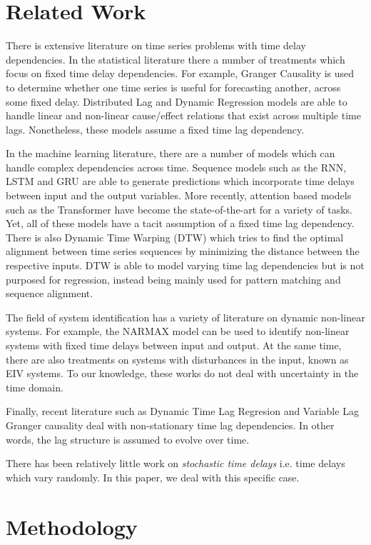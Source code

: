 \documentclass[11pt]{amsart}
\begin{document}
\section{Related Work}
There is extensive literature on time series problems with time delay dependencies. In the statistical literature there a number of treatments which focus on 
fixed time delay dependencies. For example, Granger Causality is used to determine whether one time series is useful for forecasting another, across some fixed delay.
Distributed Lag and Dynamic Regression models are able to handle linear and non-linear cause/effect relations that exist across multiple time lags.
Nonetheless, these models assume a fixed time lag dependency.

In the machine learning literature, there are a number of models which can handle complex dependencies across time. Sequence models such as the RNN, LSTM and GRU 
are able to generate predictions which incorporate time delays between input and the output variables. More recently, attention based models such as the Transformer have become the state-of-the-art for a
variety of tasks. Yet, all of these models have a tacit assumption of a fixed time lag dependency. There is also Dynamic Time Warping (DTW) which tries to find the optimal alignment between time series sequences by minimizing the
distance between the respective inputs. DTW is able to model varying time lag dependencies but is not purposed for regression, instead being mainly used for pattern matching and sequence alignment.

The field of system identification has a variety of literature on dynamic non-linear systems. For example, the NARMAX model can be used to identify 
non-linear systems with fixed time delays between input and output. At the same time, there are also treatments on systems with disturbances in the input, known as EIV systems. To our knowledge,
these works do not deal with uncertainty in the time domain.

Finally, recent literature such as Dynamic Time Lag Regresion and Variable Lag Granger causality deal with non-stationary time lag dependencies. In other words, the lag structure is assumed to evolve over time.

There has been relatively little work on \emph{stochastic time delays} i.e. time delays which vary randomly. In this paper, we deal with this specific case.


\section{Methodology}
\end{document}
